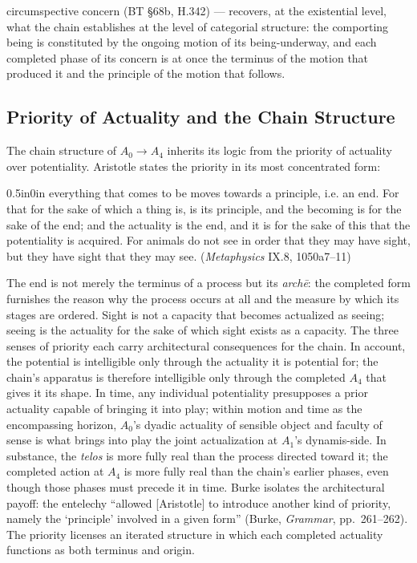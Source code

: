 \documentclass{article}
\begin{document}
circumspective concern (BT \S 68b, H.342) --- recovers, at the existential level, what the chain establishes at the level of categorial structure: the comporting being is constituted by the ongoing motion of its being-underway, and each completed phase of its concern is at once the terminus of the motion that produced it and the principle of the motion that follows.

\subsection{Priority of Actuality and the Chain Structure}

The chain structure of $A_0 \rightarrow A_4$ inherits its logic from the priority of actuality over potentiality. Aristotle states the priority in its most concentrated form:
\begin{adjustwidth}{0.5in}{0in}
everything that comes to be moves towards a principle, i.e. an end. For that for the sake of which a thing is, is its principle, and the becoming is for the sake of the end; and the actuality is the end, and it is for the sake of this that the potentiality is acquired. For animals do not see in order that they may have sight, but they have sight that they may see. (\textit{Metaphysics} IX.8, 1050a7--11)
\end{adjustwidth}
The end is not merely the terminus of a process but its \textit{archē}: the completed form furnishes the reason why the process occurs at all and the measure by which its stages are ordered. Sight is not a capacity that becomes actualized as seeing; seeing is the actuality for the sake of which sight exists as a capacity. The three senses of priority each carry architectural consequences for the chain. In account, the potential is intelligible only through the actuality it is potential for; the chain's apparatus is therefore intelligible only through the completed $A_4$ that gives it its shape. In time, any individual potentiality presupposes a prior actuality capable of bringing it into play; within motion and time as the encompassing horizon, $A_0$'s dyadic actuality of sensible object and faculty of sense is what brings into play the joint actualization at $A_1$'s dynamis-side. In substance, the \textit{telos} is more fully real than the process directed toward it; the completed action at $A_4$ is more fully real than the chain's earlier phases, even though those phases must precede it in time. Burke isolates the architectural payoff: the entelechy ``allowed [Aristotle] to introduce another kind of priority, namely the `principle' involved in a given form'' (Burke, \textit{Grammar}, pp.~261--262). The priority licenses an iterated structure in which each completed actuality functions as both terminus and origin.
\end{document}
